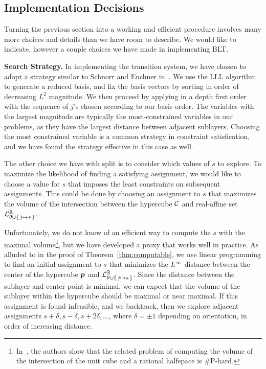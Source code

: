 \subsection{Implementation Decisions}
\label{ssec:blt-optimizations}

Turning the previous section into a working and efficient
procedure involves many more choices and details than
we have room to describe.  We would like to indicate, however a couple choices
we have made in implementing BLT.

\textbf{Search Strategy.}
%
In implementing the transition system,
we have chosen to adopt a strategy similar to Schnorr and Euchner
in~\cite{Schnorr-Euchner}.
%
We use the LLL algorithm~\cite{Lenstra} to generate a reduced basis, and
fix the basis vectors by sorting in order of decreasing $L^2$ magnitude.
%
We then proceed by applying  in a depth first order
with the sequence of $j$'s chosen according to our basis order.
%
The variables with the largest magnitude are typically the
most-constrained variables in our problems, as they have the largest
distance between adjacent sublayers.
%
Choosing the most constrained variable is a common strategy in
constraint satisfication, and we have found the strategy effective
in this case as well.

The other choice we have with split is to consider which values of $s$ to
explore.  To maximize the likelihood of finding a satisfying assignment,
we would like to choose a value for $s$ that imposes the least
constraints on subsequent assignments.
This could be done by choosing
an assignment to $s$ that maximizes the volume of the intersection
between the hypercube $\mathcal{C}$ and real-affine set
$\mathcal{L}^{\mathbb{R}}_{\theta \cup \{\,j \mapsto s\,\}}$.

Unfortunately, we do not know of an efficient way to compute the
$s$ with the maximal volume\footnote{In~\cite{dyer_freize88}, the
authors show that the related problem of computing the volume of the
intersection of the unit cube and a rational halfspace is \#P-hard.},
but we have developed a proxy that works well in practice.
%
As alluded to in the proof of Theorem~\ref{thm:computable}, we
use linear programming to find an initial assignment to $s$ that minimizes
the $L^\infty$-distance between the center of the hypercube $\boldsymbol{p}$ and
$\mathcal{L}^{\mathbb{R}}_{\theta \cup \{\,j \mapsto s\,\}}$.
%
Since the distance between the sublayer and center point is minimal, we
can expect that the volume of the sublayer within the hypercube should
be maximal or near maximal.  If this assignment is found
infeasible, and we backtrack, then we explore adjacent assignments
$s + \delta, s - \delta, s + 2\delta, \ldots{}$, where $\delta = \pm 1$
depending on orientation, in order of increasing distance.

